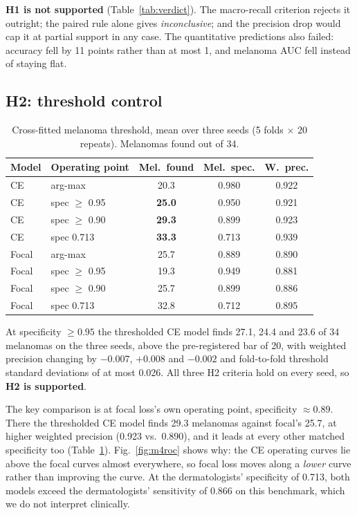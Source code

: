 \documentclass[conference]{IEEEtran}
\begin{document}
\textbf{H1 is not supported} (Table~\ref{tab:verdict}). The macro-recall criterion rejects it outright; the paired rule alone gives \emph{inconclusive}; and the precision drop would cap it at partial support in any case. The quantitative predictions also failed: accuracy fell by 11 points rather than at most 1, and melanoma AUC fell instead of staying flat.

\subsection{H2: threshold control}
\begin{table}[t]
\caption{Cross-fitted melanoma threshold, mean over three seeds (5 folds $\times$ 20 repeats). Melanomas found out of 34.}
\label{tab:h2}
\centering
\footnotesize
\setlength{\tabcolsep}{3pt}
\begin{tabular}{llccc}
\toprule
Model & Operating point & Mel.\ found & Mel.\ spec. & W.\ prec.\\
\midrule
CE & arg-max & 20.3 & 0.980 & 0.922\\
CE & spec $\geq$ 0.95 & \textbf{25.0} & 0.950 & 0.921\\
CE & spec $\geq$ 0.90 & \textbf{29.3} & 0.899 & 0.923\\
CE & spec 0.713 & \textbf{33.3} & 0.713 & 0.939\\
\midrule
Focal & arg-max & 25.7 & 0.889 & 0.890\\
Focal & spec $\geq$ 0.95 & 19.3 & 0.949 & 0.881\\
Focal & spec $\geq$ 0.90 & 25.7 & 0.899 & 0.886\\
Focal & spec 0.713 & 32.8 & 0.712 & 0.895\\
\bottomrule
\end{tabular}
\end{table}

At specificity $\geq0.95$ the thresholded CE model finds 27.1, 24.4 and 23.6 of 34 melanomas on the three seeds, above the pre-registered bar of 20, with weighted precision changing by $-0.007$, $+0.008$ and $-0.002$ and fold-to-fold threshold standard deviations of at most 0.026. All three H2 criteria hold on every seed, so \textbf{H2 is supported}.

The key comparison is at focal loss's own operating point, specificity $\approx0.89$. There the thresholded CE model finds 29.3 melanomas against focal's 25.7, at higher weighted precision (0.923 vs.\ 0.890), and it leads at every other matched specificity too (Table~\ref{tab:h2}). Fig.~\ref{fig:m4roc} shows why: the CE operating curves lie above the focal curves almost everywhere, so focal loss moves along a \emph{lower} curve rather than improving the curve. At the dermatologists' specificity of 0.713, both models exceed the dermatologists' sensitivity of 0.866 on this benchmark, which we do not interpret clinically.
\end{document}
